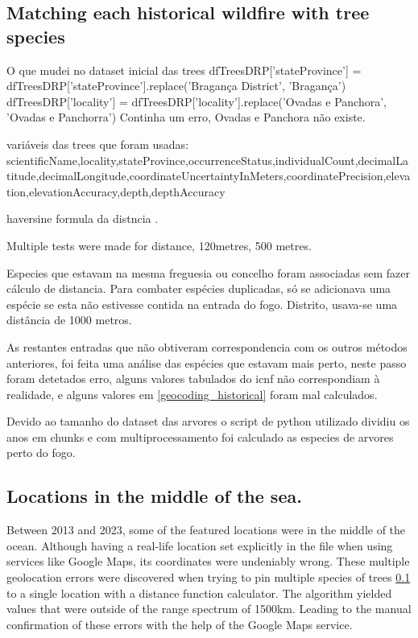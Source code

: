 \subsection{Matching each historical wildfire with tree species}
\label{tree_species_wildfires}


O que mudei no dataset inicial das trees
dfTreesDRP['stateProvince'] = dfTreesDRP['stateProvince'].replace('Bragança District', 'Bragança')
dfTreesDRP['locality'] = dfTreesDRP['locality'].replace('Ovadas e Panchora', 'Ovadas e Panchorra')
Continha um erro, Ovadas e Panchora não existe.


variáveis das trees que foram usadas: scientificName,locality,stateProvince,occurrenceStatus,individualCount,decimalLatitude,decimalLongitude,coordinateUncertaintyInMeters,coordinatePrecision,elevation,elevationAccuracy,depth,depthAccuracy


haversine formula da distncia \cite{esri2024}.


Multiple tests were made for distance, 120metres, 500 metres.

Especies que estavam na mesma freguesia ou concelho foram associadas sem fazer cálculo de distancia. Para combater espécies duplicadas, só se adicionava uma espécie se esta não estivesse contida na entrada do fogo.
Distrito, usava-se uma distância de 1000 metros.

As restantes entradas que não obtiveram correspondencia com os outros métodos anteriores, foi feita uma análise das espécies que estavam mais perto, neste passo foram detetados erro, alguns valores tabulados do icnf não correspondiam à realidade, e alguns valores em \ref{geocoding_historical} foram mal calculados.

Devido ao tamanho do dataset das arvores o script de python utilizado dividiu os anos em chunks e com multiprocessamento foi calculado as especies de arvores perto do fogo.


\subsection{Locations in the middle of the sea.}
Between 2013 and 2023, some of the featured locations were in the middle of the ocean. Although having a real-life location set explicitly in the file when using services like Google Maps, its coordinates were undeniably wrong. These multiple geolocation errors were discovered when trying to pin multiple species of trees \ref{tree_species_wildfires} to a single location with a distance function calculator. The algorithm yielded values that were outside of the range spectrum of 1500km. Leading to the manual confirmation of these errors with the help of the Google Maps service.



